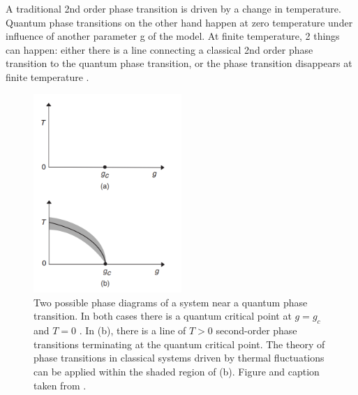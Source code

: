 A traditional 2nd order phase transition is driven by a change in temperature. Quantum phase transitions on the other hand happen at zero temperature under influence of another parameter g of the model. At finite temperature, 2 things can happen: either there is a line connecting a classical 2nd order phase transition to the quantum phase transition, or the phase transition disappears at finite temperature \cite{Sachdev1999}.

\begin{figure}
    \center
    \includegraphics[width=0.5\textwidth]{Figuren/crit/Screenshot from 2021-05-06 15-58-55.png}
    \caption{ Two possible phase diagrams of a system near a quantum phase transition. In both cases there is a quantum critical point at $g = g_c$ and $T = 0$ . In (b), there is a line of $T > 0$ second-order phase transitions terminating at the quantum critical point. The theory of phase transitions in classical systems driven by thermal fluctuations can be applied within the shaded region of (b).  Figure and caption taken from \cite{Sachdev1999}. }
    \label{fig:crit:qtran}
\end{figure}


